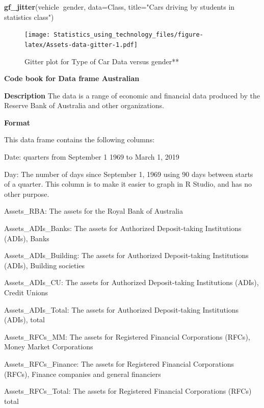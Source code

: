 \documentclass[]{book}
\newenvironment{Shaded}{\begin{snugshade}}{\end{snugshade}}
\newcommand{\DataTypeTok}[1]{\textcolor[rgb]{0.13,0.29,0.53}{#1}}
\newcommand{\KeywordTok}[1]{\textcolor[rgb]{0.13,0.29,0.53}{\textbf{#1}}}
\newcommand{\NormalTok}[1]{#1}
\newcommand{\OperatorTok}[1]{\textcolor[rgb]{0.81,0.36,0.00}{\textbf{#1}}}
\newcommand{\StringTok}[1]{\textcolor[rgb]{0.31,0.60,0.02}{#1}}
\begin{document}
\begin{Shaded}
\begin{Highlighting}[]
\KeywordTok{gf_jitter}\NormalTok{(vehicle}\OperatorTok{~}\NormalTok{gender, }\DataTypeTok{data=}\NormalTok{Class, }\DataTypeTok{title=}\StringTok{"Cars driving by students in statistics class"}\NormalTok{)}
\end{Highlighting}
\end{Shaded}

\begin{figure}
\centering
\texttt{[image: Statistics\_using\_technology\_files/figure-latex/Assets-data-gitter-1.pdf]}
\caption{\label{fig:Assets-data-gitter}Gitter plot for Type of Car Data versus gender**}
\end{figure}

\textbf{Code book for Data frame Australian}

\textbf{Description}
The data is a range of economic and financial data produced by the Reserve Bank of Australia and other organizations.

\textbf{Format}

This data frame contains the following columns:

Date: quarters from September 1 1969 to March 1, 2019

Day: The number of days since September 1, 1969 using 90 days between starts of a quarter. This column is to make it easier to graph in R Studio, and has no other purpose.

Assets\_RBA: The assets for the Royal Bank of Australia

Assets\_ADIs\_Banks: The assets for Authorized Deposit-taking Institutions (ADIs), Banks

Assets\_ADIs\_Building: The assets for Authorized Deposit-taking Institutions (ADIs), Building societies

Assets\_ADIs\_CU: The assets for Authorized Deposit-taking Institutions (ADIs), Credit Unions

Assets\_ADIs\_Total: The assets for Authorized Deposit-taking Institutions (ADIs), total

Assets\_RFCs\_MM: The assets for Registered Financial Corporations (RFCs), Money Market Corporations

Assets\_RFCs\_Finance: The assets for Registered Financial Corporations (RFCs), Finance companies and general financiers

Assets\_RFCs\_Total: The assets for Registered Financial Corporations (RFCs) total
\end{document}
